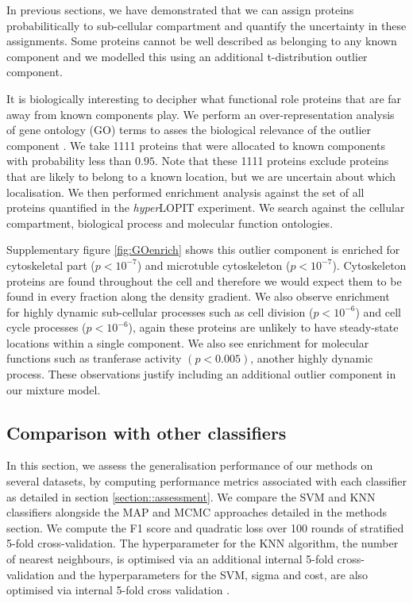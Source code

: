 \documentclass[12pt,english]{article}\usepackage[]{graphicx}\usepackage[]{color}
\begin{document}
In previous sections, we have demonstrated that we can assign proteins
probabilitically to sub-cellular compartment and quantify the
uncertainty in these assignments. Some proteins cannot be well
described as belonging to any known component and we modelled this
using an additional t-distribution outlier component.

It is biologically interesting to decipher what functional role
proteins that are far away from known components play. We perform an
over-representation analysis of gene ontology (GO) terms to asses the
biological relevance of the outlier component \citep{Boyle:2004,
  Yu:2012}. We take 1111 proteins that were allocated to known
components with probability less than $0.95$.  Note that these 1111
proteins exclude proteins that are likely to belong to a known
location, but we are uncertain about which localisation.  We then
performed enrichment analysis against the set of all proteins
quantified in the \textit{hyper}LOPIT experiment. We search against
the cellular compartment, biological process and molecular function
ontologies.

Supplementary figure \ref{fig:GOenrich} shows this outlier component
is enriched for cytoskeletal part ($p <10^{-7}$) and microtuble
cytoskeleton ($p <10^{-7}$). Cytoskeleton proteins are found
throughout the cell and therefore we would expect them to be found in
every fraction along the density gradient. We also observe enrichment
for highly dynamic sub-cellular processes such as cell division
($p <10^{-6}$) and cell cycle processes ($p <10^{-6}$), again these
proteins are unlikely to have steady-state locations within a single
component. We also see enrichment for molecular functions such as
tranferase activity $(p < 0.005)$, another highly dynamic
process. These observations justify including an additional outlier
component in our mixture model.


\clearpage

\subsection{Comparison with other classifiers}

In this section, we assess the generalisation performance of our
methods on several datasets, by computing performance metrics
associated with each classifier as detailed in section
\ref{section::assessment}. We compare the SVM and KNN classifiers
alongside the MAP and MCMC approaches detailed in the methods
section. We compute the F1 score and quadratic loss over 100 rounds of
stratified 5-fold cross-validation. The hyperparameter for the KNN
algorithm, the number of nearest neighbours, is optimised via an
additional internal 5-fold cross-validation and the hyperparameters
for the SVM, sigma and cost, are also optimised via internal 5-fold
cross validation \cite{svm:2010}.
\end{document}
